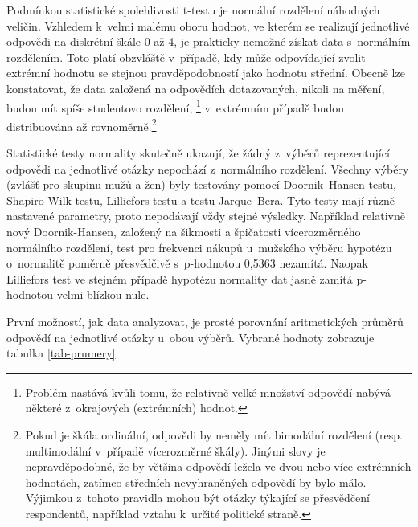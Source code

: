 \documentclass[12pt,twoside,openany]{fithesis}
\begin{document}
                Podmínkou statistické spolehlivosti t-testu je normální 
rozdělení náhodných veličin. Vzhledem k~velmi malému oboru hodnot, ve 
kterém se realizují jednotlivé odpovědi na diskrétní škále 0 až 4, je 
prakticky nemožné získat data s~normálním rozdělením. Toto platí 
obzvláště v~případě, kdy může odpovídající zvolit extrémní hodnotu 
se stejnou pravděpodobností jako hodnotu střední. Obecně lze konstatovat, 
že data založená na odpovědích dotazovaných, nikoli na měření, budou 
mít spíše studentovo rozdělení, 
\footnote{
                    Problém nastává kvůli tomu, že relativně velké 
množství odpovědí nabývá některé z~okrajových (extrémních) hodnot.
                }
v~extrémním případě budou distribuována až 
rovnoměrně.\footnote{
                    Pokud je škála ordinální, odpovědi by neměly mít 
bimodální rozdělení (resp. multimodální v~případě vícerozměrné 
škály). Jinými slovy je nepravděpodobné, že by většina odpovědí 
ležela ve dvou nebo více extrémních hodnotách, zatímco středních 
nevyhraněných odpovědí by bylo málo. Výjimkou z~tohoto pravidla mohou 
být otázky týkající se přesvědčení respondentů, například vztahu 
k~určité politické straně.
                }

                Statistické testy normality skutečně ukazují, že žádný 
z~výběrů reprezentující odpovědi na jednotlivé otázky nepochází 
z~normálního rozdělení. Všechny výběry (zvlášť pro skupinu mužů a 
žen) byly testovány pomocí Doornik--Hansen testu, Shapiro-Wilk testu, 
Lilliefors testu a testu Jarque--Bera. Tyto testy mají různě nastavené 
parametry, proto nepodávají vždy stejné výsledky. Například relativně 
nový Doornik-Hansen, založený na šikmosti a špičatosti vícerozměrného 
normálního rozdělení, test pro frekvenci nákupů u~mužského výběru 
hypotézu o~normalitě poměrně přesvědčivě s~p-hodnotou 0,5363 
nezamítá. \cite{dh-test}{} Naopak Lilliefors test ve stejném případě 
hypotézu normality dat jasně zamítá p-hodnotou velmi blízkou nule.

                První možností, jak data analyzovat, je prosté porovnání 
aritmetických průměrů odpovědí na jednotlivé otázky u~obou výběrů. 
Vybrané hodnoty zobrazuje tabulka \hyperlink{tab-prumery}{\ref{tab-prumery}}.
\end{document}
